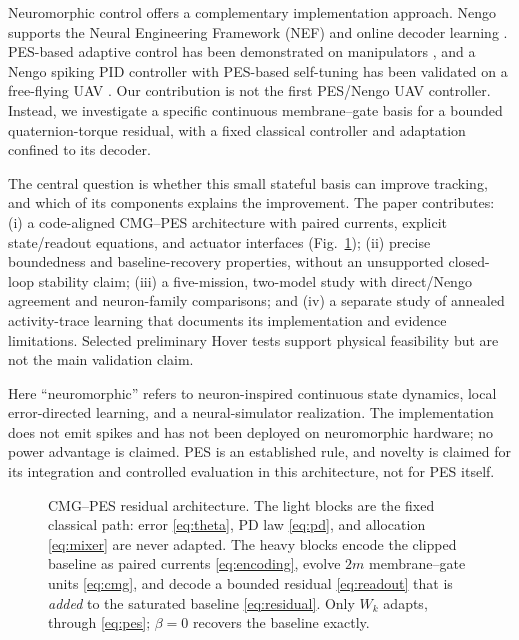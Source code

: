 \documentclass[letterpaper,10pt,conference]{IEEEtran}
\begin{document}
Neuromorphic control offers a complementary implementation approach.
Nengo supports the Neural Engineering Framework (NEF) and online decoder
learning \cite{bekolay2014nengo}. PES-based adaptive control has been
demonstrated on manipulators \cite{dewolf2016arm,dewolf2020nengo}, and a
Nengo spiking PID controller with PES-based self-tuning has been validated
on a free-flying UAV \cite{olivares2026selftuning}. Our contribution is not
the first PES/Nengo UAV controller. Instead, we investigate a specific
continuous membrane--gate basis for a bounded quaternion-torque residual,
with a fixed classical controller and adaptation confined to its decoder.

The central question is whether this small stateful basis can improve
tracking, and which of its components explains the improvement. The paper
contributes: (i) a code-aligned CMG--PES architecture with paired currents,
explicit state/readout equations, and actuator interfaces
(Fig.~\ref{fig:arch}); (ii) precise
boundedness and baseline-recovery properties, without an unsupported
closed-loop stability claim; (iii) a five-mission, two-model study with
direct/Nengo agreement and neuron-family comparisons; and (iv) a separate
study of annealed activity-trace learning that documents its implementation
and evidence limitations. Selected preliminary Hover tests support
physical feasibility but are not the main validation claim.

Here ``neuromorphic'' refers to neuron-inspired continuous state dynamics,
local error-directed learning, and a neural-simulator realization. The
implementation does not emit spikes and has not been deployed on
neuromorphic hardware; no power advantage is claimed. PES is an
established rule, and novelty is claimed for its integration and controlled
evaluation in this architecture, not for PES itself.

\begin{figure}[t]
\centering
\resizebox{\textwidth}{!}{}
\caption{CMG--PES residual architecture. The light blocks are the fixed
classical path: error \eqref{eq:theta}, PD law \eqref{eq:pd}, and
allocation \eqref{eq:mixer} are never adapted. The heavy blocks encode the
clipped baseline as paired currents \eqref{eq:encoding}, evolve $2m$
membrane--gate units \eqref{eq:cmg}, and decode a bounded residual
\eqref{eq:readout} that is \emph{added} to the saturated baseline
\eqref{eq:residual}. Only $W_k$ adapts, through \eqref{eq:pes}; $\beta=0$
recovers the baseline exactly.}
\label{fig:arch}
\end{figure}
\end{document}
